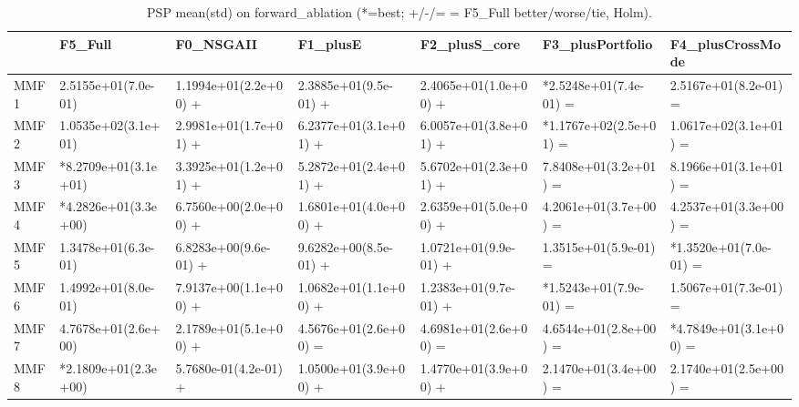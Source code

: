 \begin{table}[t]
\centering
\caption{PSP mean(std) on forward_ablation (*=best; +/-/= = F5_Full better/worse/tie, Holm).}
\label{tab:forward_ablation_PSP}
\begin{tabular}{lllllll}
\toprule
 & F5\_Full & F0\_NSGAII & F1\_plusE & F2\_plusS\_core & F3\_plusPortfolio & F4\_plusCrossMode \\
\midrule
MMF1 & 2.5155e+01(7.0e-01) & 1.1994e+01(2.2e+00) + & 2.3885e+01(9.5e-01) + & 2.4065e+01(1.0e+00) + & *2.5248e+01(7.4e-01) = & 2.5167e+01(8.2e-01) = \\
MMF2 & 1.0535e+02(3.1e+01) & 2.9981e+01(1.7e+01) + & 6.2377e+01(3.1e+01) + & 6.0057e+01(3.8e+01) + & *1.1767e+02(2.5e+01) = & 1.0617e+02(3.1e+01) = \\
MMF3 & *8.2709e+01(3.1e+01) & 3.3925e+01(1.2e+01) + & 5.2872e+01(2.4e+01) + & 5.6702e+01(2.3e+01) + & 7.8408e+01(3.2e+01) = & 8.1966e+01(3.1e+01) = \\
MMF4 & *4.2826e+01(3.3e+00) & 6.7560e+00(2.0e+00) + & 1.6801e+01(4.0e+00) + & 2.6359e+01(5.0e+00) + & 4.2061e+01(3.7e+00) = & 4.2537e+01(3.3e+00) = \\
MMF5 & 1.3478e+01(6.3e-01) & 6.8283e+00(9.6e-01) + & 9.6282e+00(8.5e-01) + & 1.0721e+01(9.9e-01) + & 1.3515e+01(5.9e-01) = & *1.3520e+01(7.0e-01) = \\
MMF6 & 1.4992e+01(8.0e-01) & 7.9137e+00(1.1e+00) + & 1.0682e+01(1.1e+00) + & 1.2383e+01(9.7e-01) + & *1.5243e+01(7.9e-01) = & 1.5067e+01(7.3e-01) = \\
MMF7 & 4.7678e+01(2.6e+00) & 2.1789e+01(5.1e+00) + & 4.5676e+01(2.6e+00) = & 4.6981e+01(2.6e+00) = & 4.6544e+01(2.8e+00) = & *4.7849e+01(3.1e+00) = \\
MMF8 & *2.1809e+01(2.3e+00) & 5.7680e-01(4.2e-01) + & 1.0500e+01(3.9e+00) + & 1.4770e+01(3.9e+00) + & 2.1470e+01(3.4e+00) = & 2.1740e+01(2.5e+00) = \\
\bottomrule
\end{tabular}
\end{table}

